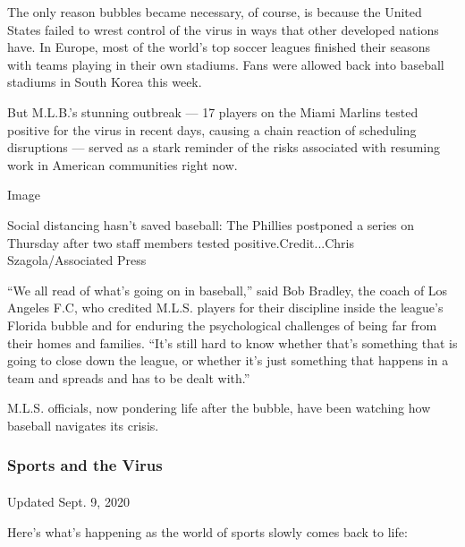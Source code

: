 The only reason bubbles became necessary, of course, is because the
United States failed to wrest control of the virus in ways that other
developed nations have. In Europe, most of the world's top soccer
leagues finished their seasons with teams playing in their own stadiums.
Fans were allowed back into baseball stadiums in South Korea this week.

But M.L.B.'s stunning outbreak --- 17 players on the Miami Marlins
tested positive for the virus in recent days, causing a chain reaction
of scheduling disruptions --- served as a stark reminder of the risks
associated with resuming work in American communities right now.

Image

Social distancing hasn't saved baseball: The Phillies postponed a series
on Thursday after two staff members tested positive.Credit...Chris
Szagola/Associated Press

``We all read of what's going on in baseball,'' said Bob Bradley, the
coach of Los Angeles F.C, who credited M.L.S. players for their
discipline inside the league's Florida bubble and for enduring the
psychological challenges of being far from their homes and families.
``It's still hard to know whether that's something that is going to
close down the league, or whether it's just something that happens in a
team and spreads and has to be dealt with.''

M.L.S. officials, now pondering life after the bubble, have been
watching how baseball navigates its crisis.

\hypertarget{sports-and-the-virus}{%
\subsubsection{Sports and the Virus}\label{sports-and-the-virus}}

\paragraph{}

Updated Sept. 9, 2020

Here's what's happening as the world of sports slowly comes back to
life:

